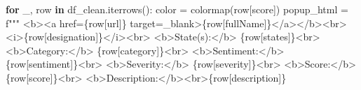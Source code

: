 \documentclass[
  letterpaper,
  DIV=11,
  numbers=noendperiod]{scrartcl}
\newenvironment{Shaded}{\begin{snugshade}}{\end{snugshade}}
\newcommand{\ControlFlowTok}[1]{\textcolor[rgb]{0.00,0.23,0.31}{\textbf{#1}}}
\newcommand{\KeywordTok}[1]{\textcolor[rgb]{0.00,0.23,0.31}{\textbf{#1}}}
\newcommand{\NormalTok}[1]{\textcolor[rgb]{0.00,0.23,0.31}{#1}}
\newcommand{\OperatorTok}[1]{\textcolor[rgb]{0.37,0.37,0.37}{#1}}
\newcommand{\SpecialCharTok}[1]{\textcolor[rgb]{0.37,0.37,0.37}{#1}}
\newcommand{\SpecialStringTok}[1]{\textcolor[rgb]{0.13,0.47,0.30}{#1}}
\newcommand{\StringTok}[1]{\textcolor[rgb]{0.13,0.47,0.30}{#1}}
\begin{document}
\begin{Shaded}
\begin{Highlighting}[]
    \ControlFlowTok{for}\NormalTok{ \_, row }\KeywordTok{in}\NormalTok{ df\_clean.iterrows():}
\NormalTok{        color }\OperatorTok{=}\NormalTok{ colormap(row[}\StringTok{\textquotesingle{}score\textquotesingle{}}\NormalTok{])}
\NormalTok{        popup\_html }\OperatorTok{=} \SpecialStringTok{f"""}
\SpecialStringTok{        \textless{}b\textgreater{}\textless{}a href=\textquotesingle{}}\SpecialCharTok{\{}\NormalTok{row[}\StringTok{\textquotesingle{}url\textquotesingle{}}\NormalTok{]}\SpecialCharTok{\}}\SpecialStringTok{\textquotesingle{} target=\textquotesingle{}\_blank\textquotesingle{}\textgreater{}}\SpecialCharTok{\{}\NormalTok{row[}\StringTok{\textquotesingle{}fullName\textquotesingle{}}\NormalTok{]}\SpecialCharTok{\}}\SpecialStringTok{\textless{}/a\textgreater{}\textless{}/b\textgreater{}\textless{}br\textgreater{}}
\SpecialStringTok{        \textless{}i\textgreater{}}\SpecialCharTok{\{}\NormalTok{row[}\StringTok{\textquotesingle{}designation\textquotesingle{}}\NormalTok{]}\SpecialCharTok{\}}\SpecialStringTok{\textless{}/i\textgreater{}\textless{}br\textgreater{}}
\SpecialStringTok{        \textless{}b\textgreater{}State(s):\textless{}/b\textgreater{} }\SpecialCharTok{\{}\NormalTok{row[}\StringTok{\textquotesingle{}states\textquotesingle{}}\NormalTok{]}\SpecialCharTok{\}}\SpecialStringTok{\textless{}br\textgreater{}}
\SpecialStringTok{        \textless{}b\textgreater{}Category:\textless{}/b\textgreater{} }\SpecialCharTok{\{}\NormalTok{row[}\StringTok{\textquotesingle{}category\textquotesingle{}}\NormalTok{]}\SpecialCharTok{\}}\SpecialStringTok{\textless{}br\textgreater{}}
\SpecialStringTok{        \textless{}b\textgreater{}Sentiment:\textless{}/b\textgreater{} }\SpecialCharTok{\{}\NormalTok{row[}\StringTok{\textquotesingle{}sentiment\textquotesingle{}}\NormalTok{]}\SpecialCharTok{\}}\SpecialStringTok{\textless{}br\textgreater{}}
\SpecialStringTok{        \textless{}b\textgreater{}Severity:\textless{}/b\textgreater{} }\SpecialCharTok{\{}\NormalTok{row[}\StringTok{\textquotesingle{}severity\textquotesingle{}}\NormalTok{]}\SpecialCharTok{\}}\SpecialStringTok{\textless{}br\textgreater{}}
\SpecialStringTok{        \textless{}b\textgreater{}Score:\textless{}/b\textgreater{} }\SpecialCharTok{\{}\NormalTok{row[}\StringTok{\textquotesingle{}score\textquotesingle{}}\NormalTok{]}\SpecialCharTok{\}}\SpecialStringTok{\textless{}br\textgreater{}}
\SpecialStringTok{        \textless{}b\textgreater{}Description:\textless{}/b\textgreater{}\textless{}br\textgreater{}}\SpecialCharTok{\{}\NormalTok{row[}\StringTok{\textquotesingle{}description\textquotesingle{}}\NormalTok{]}\SpecialCharTok{\}}

\end{Highlighting}
\end{Shaded}
\end{document}
